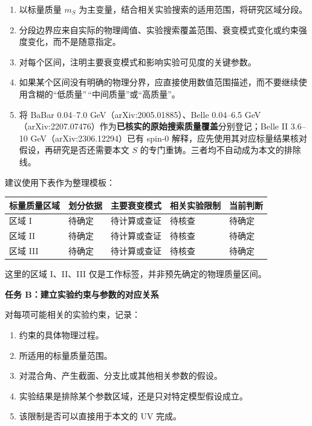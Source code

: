 \documentclass[
  chinese,
  UTF8]{ctexart}
\newcounter{none} %
\providecommand{\tightlist}{%
  \setlength{\itemsep}{0pt}\setlength{\parskip}{0pt}}
\begin{document}
\begin{enumerate}
\def\labelenumi{\arabic{enumi}.}
\tightlist
\item
  以标量质量 \(m_S\)
  为主变量，结合相关实验搜索的适用范围，将研究区域分段。
\item
  分段边界应来自实际的物理阈值、实验搜索覆盖范围、衰变模式变化或约束强度变化，而不是随意指定。
\item
  对每个区间，注明主要衰变模式和影响实验可见度的关键参数。
\item
  如果某个区间没有明确的物理分界，应直接使用数值范围描述，而不要继续使用含糊的``低质量''\,``中间质量''或``高质量''。
\item
  将 BaBar 0.04--7.0 GeV（arXiv:2005.01885）、Belle 0.04--6.5
  GeV（arXiv:2207.07476）作为\textbf{已核实的原始搜索质量覆盖}分别登记；Belle
  II 3.6--10 GeV（arXiv:2306.12294）已有 spin-0
  解释，应先使用其对应标量结果核对假设，再研究是否还需要本文 \(S\)
  的专门重铸。三者均不自动成为本文的排除线。
\end{enumerate}

建议使用下表作为整理模板：

{\def\LTcaptype{none} %
\begin{longtable}[]{@{}lllll@{}}
\toprule\noalign{}
标量质量区域 & 划分依据 & 主要衰变模式 & 相关实验限制 & 当前判断 \\
\midrule\noalign{}
\endhead
\bottomrule\noalign{}
\endlastfoot
区域 I & 待确定 & 待计算或查证 & 待核查 & 待确定 \\
区域 II & 待确定 & 待计算或查证 & 待核查 & 待确定 \\
区域 III & 待确定 & 待计算或查证 & 待核查 & 待确定 \\
\end{longtable}
}

这里的区域 I、II、III 仅是工作标签，并非预先确定的物理质量区间。

\textbf{任务 B：建立实验约束与参数的对应关系}

对每项可能相关的实验约束，记录：

\begin{enumerate}
\def\labelenumi{\arabic{enumi}.}
\tightlist
\item
  约束的具体物理过程。
\item
  所适用的标量质量范围。
\item
  对混合角、产生截面、分支比或其他相关参数的假设。
\item
  实验结果是排除某个参数区域，还是只对特定模型假设成立。
\item
  该限制是否可以直接用于本文的 UV 完成。
\end{enumerate}
\end{document}
